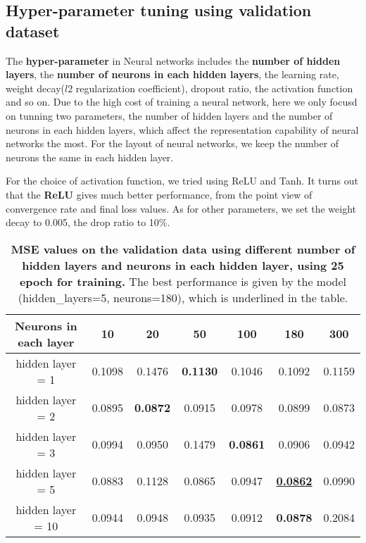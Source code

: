\documentclass{article} %
\begin{document}
\subsection{Hyper-parameter tuning using validation dataset}
The \textbf{hyper-parameter} in Neural networks includes the \textbf{number of hidden layers}, the \textbf{number of neurons in each hidden layers}, the learning rate, weight decay($l2$ regularization coefficient), dropout ratio, the activation function and so on. Due to the high cost of training a neural network, here we only focusd on tunning two parameters, the number of hidden layers and the number of neurons in each hidden layers, which affect the representation capability of neural networks the most. For the layout of neural networks, we keep the number of neurons the same in each hidden layer.

For the choice of activation function, we tried using ReLU and Tanh. It turns out that the \textbf{ReLU} gives much better performance, from the point view of convergence rate and final loss values. As for other parameters, we set the weight decay to 0.005, the drop ratio to 10\%.



\begin{table}[htbp]
	\small
	\centering
	\begin{tabular}{@{}|c|c|c|c|c|c|c|@{}} %
		\hline
		Neurons in each layer & 10 & 20 & 50 & 100 & 180 & 300\\ 
		\cline{1-7} \hline \hline
		hidden layer = 1 & 0.1098 & 0.1476 & \textbf{0.1130} & 0.1046  & 0.1092 & 0.1159 \\
		
		hidden layer = 2 & 0.0895  & \textbf{0.0872} & 0.0915 & 0.0978 & 0.0899 & 0.0873 \\ 
		hidden layer = 3 &  0.0994 & 0.0950 & 0.1479 & \textbf{0.0861} & 0.0906  & 0.0942 \\ 
		 hidden layer = 5 & 0.0883 & 0.1128 & 0.0865 & 0.0947 & \textbf{\underline{0.0862}}  & 0.0990\\ 
		 hidden layer = 10 & 0.0944 & 0.0948 & 0.0935 & 0.0912 & \textbf{0.0878} & 0.2084  \\ \hline
	\end{tabular}
	\caption{{\bf MSE values on the validation data using different number of hidden layers and neurons in each hidden layer, using 25 epoch for training.} The best performance is given by the model (hidden\_layers=5, neurons=180), which is underlined in the table.}
	\label{tab:nn_cv}
\end{table}
\end{document}
